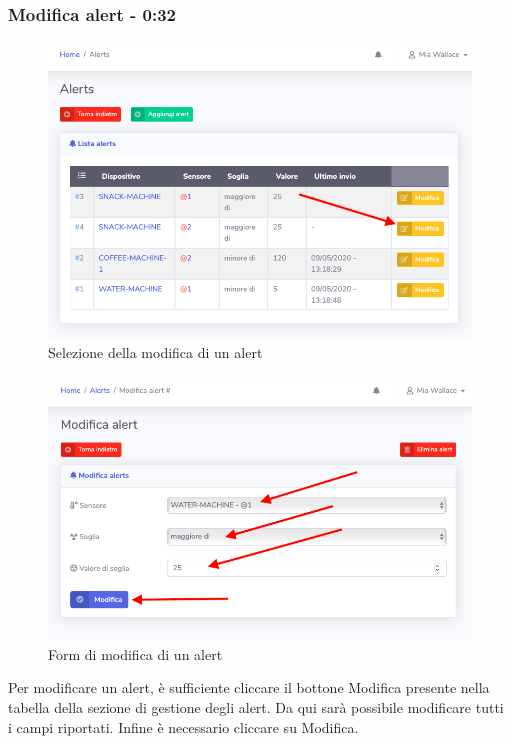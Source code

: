 	\subsubsection{Modifica alert - 0:32}
		\begin{figure}[H]
		\centering
		\includegraphics[scale=0.600]{res/images/mod/selModAlert.png}
		\caption{Selezione della modifica di un alert}
	\end{figure}
	\begin{figure}[H]
		\centering
		\includegraphics[scale=0.600]{res/images/mod/modAlert.png}
		\caption{Form di modifica di un alert}
	\end{figure}
	Per modificare un alert, è sufficiente cliccare il bottone Modifica presente nella tabella della sezione di gestione degli alert. Da qui sarà possibile modificare tutti i campi riportati. Infine è necessario cliccare su Modifica.

